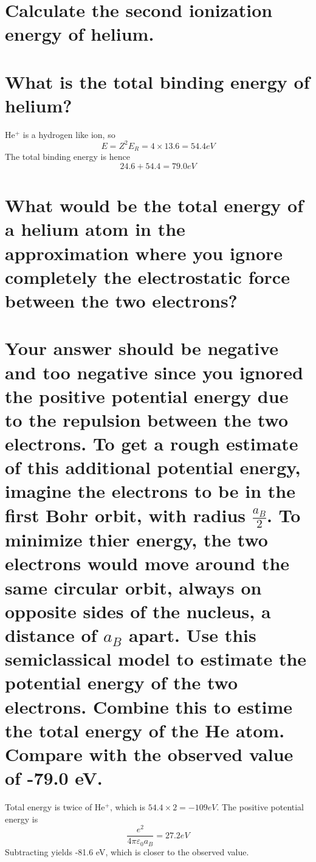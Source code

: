 \documentclass[answers]{exam}
\begin{document}
\begin{questions}
\begin{parts}
	\part{Calculate the second ionization energy of helium.}
	\part{What is the total binding energy of helium?}
\end{parts}

\begin{solution}
	He$^+$ is a hydrogen like ion, so
	$$E = Z^2E_R = 4\times13.6 = 54.4\si{eV}$$
	The total binding energy is hence
	$$24.6 + 54.4 = 79.0\si{eV}$$
\end{solution}


\begin{parts}
	\part{What would be the total energy of a helium atom in the approximation where you ignore completely the electrostatic force between the two electrons?}
	\part{Your answer should be negative and too negative since you ignored the positive potential energy due to the repulsion between the two electrons. To get a rough estimate of this additional potential energy, imagine the electrons to be in the first Bohr orbit, with radius $\frac{a_B}{2}$. To minimize thier energy, the two electrons would move around the same circular orbit, always on opposite sides of the nucleus, a distance of $a_B$ apart. Use this semiclassical model to estimate the potential energy of the two electrons. Combine this to estime the total energy of the He atom. Compare with the observed value of -79.0 eV.}
\end{parts}

\begin{solution}
	Total energy is twice of He$^+$, which is $54.4\times2 = -109\si{eV}$. The positive potential energy is
	$$\frac{e^2}{4\pi\varepsilon_0a_B} =  27.2\si{eV}$$
	Subtracting yields -81.6 eV, which is closer to the observed value.
\end{solution}


\end{questions}
\end{document}
